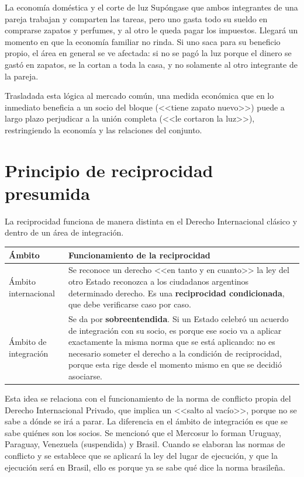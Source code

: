 \documentclass[12pt,oneside]{book}
\begin{document}
\begin{example}{La economía doméstica y el corte de luz}
Supóngase que ambos integrantes de una pareja trabajan y comparten las tareas, pero uno gasta todo su sueldo en comprarse zapatos y perfumes, y al otro le queda pagar los impuestos. Llegará un momento en que la economía familiar no rinda. Si uno saca para su beneficio propio, el área en general se ve afectada: si no se pagó la luz porque el dinero se gastó en zapatos, se la cortan a toda la casa, y no solamente al otro integrante de la pareja.

Trasladada esta lógica al mercado común, una medida económica que en lo inmediato beneficia a un socio del bloque (<<tiene zapato nuevo>>) puede a largo plazo perjudicar a la unión completa (<<le cortaron la luz>>), restringiendo la economía y las relaciones del conjunto.
\end{example}

\section{Principio de reciprocidad presumida}

La reciprocidad funciona de manera distinta en el Derecho Internacional clásico y dentro de un área de integración.

\begin{table}[H]
\centering
\small
\renewcommand{\arraystretch}{1.3}
\begin{tabularx}{\textwidth}{
    >{\raggedright\arraybackslash}p{}
    >{\raggedright\arraybackslash}X
}
\toprule
\textbf{Ámbito} & \textbf{Funcionamiento de la reciprocidad} \\
\midrule
Ámbito internacional &
Se reconoce un derecho <<en tanto y en cuanto>> la ley del otro Estado reconozca a los ciudadanos argentinos determinado derecho. Es una \textbf{reciprocidad condicionada}, que debe verificarse caso por caso. \\
\addlinespace
Ámbito de integración &
Se da por \textbf{sobreentendida}. Si un Estado celebró un acuerdo de integración con su socio, es porque ese socio va a aplicar exactamente la misma norma que se está aplicando: no es necesario someter el derecho a la condición de reciprocidad, porque esta rige desde el momento mismo en que se decidió asociarse. \\
\bottomrule
\end{tabularx}
\end{table}

Esta idea se relaciona con el funcionamiento de la norma de conflicto propia del Derecho Internacional Privado, que implica un <<salto al vacío>>, porque no se sabe a dónde se irá a parar. La diferencia en el ámbito de integración es que se sabe quiénes son los socios. %
Se mencionó que el Mercosur lo forman Uruguay, Paraguay, Venezuela (suspendida) y Brasil. Cuando se elaboran las normas de conflicto y se establece que se aplicará la ley del lugar de ejecución, y que la ejecución será en Brasil, ello es porque ya se sabe qué dice la norma brasileña.
\end{document}
